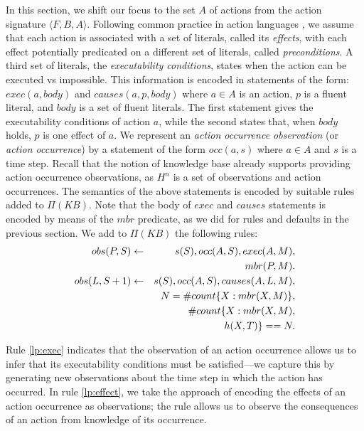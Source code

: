 \documentclass{article}
\begin{document}
In this section, we shift our focus to the set $A$ of actions from the action signature $\langle F, B, A \rangle$. Following common practice in action languages \cite{GelfondL98}, we assume that each action is  associated with a set of literals, called its \emph{effects}, with each effect potentially predicated on a different set of literals, called \emph{preconditions}. A third set of literals, the \emph{executability conditions}, states when the action can be executed vs impossible. This information is encoded in statements of the form: 
$exec(a,body)$ and $causes(a,p,body)$ 
%
where $a \in A$ is an action, $p$ is a fluent literal, and $body$ is a set of fluent literals. 
 The first statement gives the executability conditions of action $a$, while the second states that, when $body$ holds, $p$ is one effect of $a$. We represent an \emph{action occurrence observation} (or {\em action occurrence}) by a statement of the form
 $occ(a,s)$
where $a\in A$ and $s$ is a time step. Recall that the notion of knowledge base already supports providing action occurrence observations, as  $H^{n}$ is a set of observations and action occurrences. The semantics of the above statements is encoded by suitable rules added to $\Pi(KB)$. 
 Note that the body of $exec$ and $causes$ statements is encoded by means of the $mbr$ predicate, as we did for rules and defaults in the previous section. 
We add to $\Pi(KB)$ the following rules:
%
\begin{eqnarray}
obs(P, S)  & \leftarrow & s(S), occ(A, S), exec(A, M), \nonumber    \\
& & mbr(P, M).  \label{lp:exec} \\  
obs(L, S+1) & \leftarrow & s(S),     occ(A, S), causes(A, L, M), \nonumber    \\
& &  N   =\# count \{X : mbr(X, M)\},   \nonumber\\
& & \# count \{X : mbr(X, M),  \nonumber \\ 
&& \hspace*{.4in} h(X, T) \} == N.  \label{lp:effect} 
\end{eqnarray} 

Rule \eqref{lp:exec} indicates that the observation of an action occurrence allows us to infer that its executability conditions must be satisfied---we capture this by generating new observations about the time step in which the action has occurred.
In rule \eqref{lp:effect}, we take the approach of encoding the effects of an action occurrence as observations; the rule allows us to observe the consequences of an action from knowledge of its occurrence.
\end{document}
